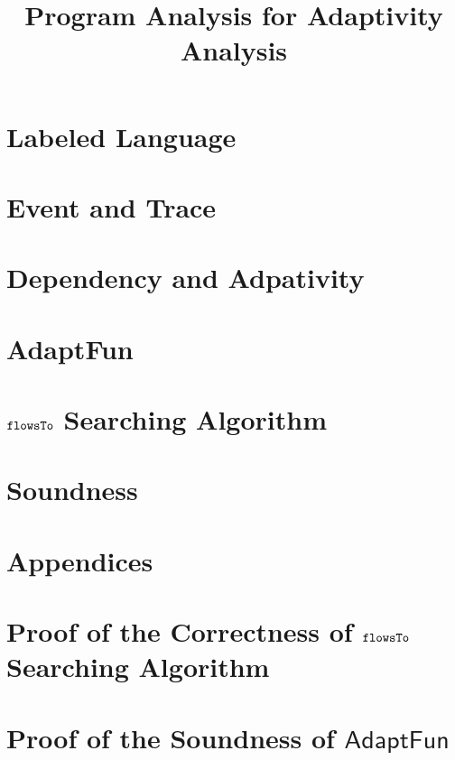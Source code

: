\documentclass[a4paper,11pt]{article}
\newcommand{\THESYSTEM}{\textsf{AdaptFun}}
\begin{document}
\title{Program Analysis for Adaptivity Analysis}

\author{}

\date{}

\maketitle
%
% 
\section{Labeled Language}

\clearpage
\section{Event and Trace}


\clearpage
\section{Dependency and Adpativity}


% 
\clearpage
\section{\THESYSTEM}


\clearpage
\section{$\mathtt{flowsTo}$ Searching Algorithm}




\section{Soundness}

\clearpage
%
\appendix
{}
\section*{Appendices}
\section{Proof of the Correctness of $\mathtt{flowsTo}$ Searching Algorithm}

\section{Proof of the Soundness of $\THESYSTEM$}
% 



\end{document}
